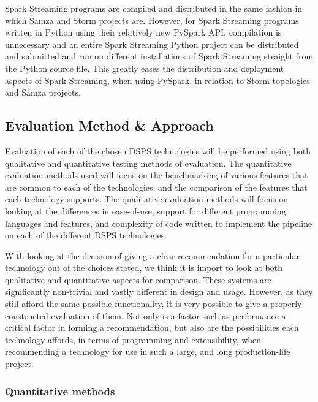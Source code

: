 Spark Streaming programs are compiled and distributed in the same fashion in which Samza and Storm projects are. However,
for Spark Streaming programs written in Python using their relatively new PySpark API, compilation is unnecessary and an entire Spark
Streaming Python project can be distributed and submitted and run on different installations of Spark Streaming straight
from the Python source file. This greatly eases the distribution and deployment aspects of Spark Streaming, when using
PySpark, in relation to Storm topologies and Samza projects.





\subsection{Evaluation Method \& Approach} %
\label{sub:evaluation_method_approach}

Evaluation of each of the chosen DSPS technologies will be performed using both qualitative and quantitative testing methods
of evaluation. The quantitative evaluation methods used will focus
on the benchmarking of various features that are common to each of the technologies, and the comparison of the features that
each technology supports. The qualitative evaluation methods will focus on looking at the differences in ease-of-use,
support for different programming languages and features, and complexity of code written to implement the pipeline on
each of the different DSPS technologies.

With looking at the decision of giving a clear recommendation for a particular technology out of the choices stated,
we think it is import to look at both qualitative and quantitative aspects for comparison. These systems are significantly
non-trivial and vastly different in design and usage. However, as they still afford the same possible functionality,
it is very possible to give a properly constructed evaluation of them. Not only is a factor such as performance a critical
factor in forming a recommendation, but also are the possibilities each technology affords, in terms of programming and
extensibility, when recommending a technology for use in such a large, and long production-life project.


\subsubsection{Quantitative methods} %
\label{ssub:quantitative_methods}

